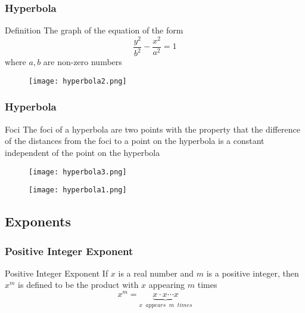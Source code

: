 \begin{frame}
  \frametitle{Hyperbola}
\begin{block}{Definition}
  The graph of the equation of the form 
  \[
\frac{y^2}{b^2} - \frac{x^2}{a^2} = 1
\]
where \(a,b\) are non-zero numbers
\end{block}
\end{frame}

\begin{frame}
  \begin{figure}
    \centering 
    \texttt{[image: hyperbola2.png]}
  \end{figure}
\end{frame}
\begin{frame}
  \frametitle{Hyperbola}
  \begin{block}{Foci}
    The foci of a hyperbola are two points with the property that the difference of
the distances from the foci to a point on the hyperbola is a constant independent
of the point on the hyperbola
  \end{block}
\end{frame}

\begin{frame}
  \begin{figure}
    \centering 
    \texttt{[image: hyperbola3.png]}
  \end{figure}
\end{frame}
\begin{frame}
  \begin{figure}
    \centering 
    \texttt{[image: hyperbola1.png]}
  \end{figure}
\end{frame}

\subsection{Exponents}
\begin{frame}
  \frametitle{Positive Integer Exponent}
  \begin{block}{Positive Integer Exponent}
    If \(x\) is a real number and \(m\) is a positive integer, then \(x^{m}\) is defined to be the
product with \(x\) appearing \(m\) times
\[x^{m} = \underset{x \;\;appears\;\;m \;\;times}{\underbrace{x \cdot x \cdots x }}\]
    
  \end{block}
\end{frame}

